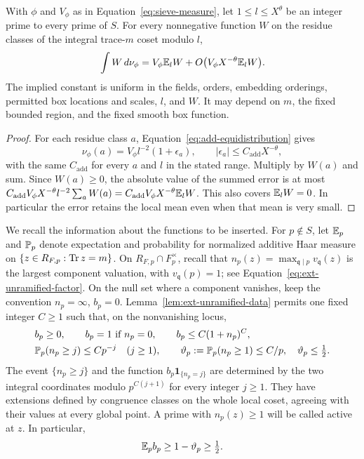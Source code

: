 \begin{lemma}\label{lem:sieve-residue-function}
With $\phi$ and $V_\phi$ as in Equation~\eqref{eq:sieve-measure}, let
$1\le l\le X^\theta$ be an integer prime to every prime of $S$.
For every nonnegative
function $W$ on the residue classes of the integral trace-$m$ coset
modulo $l$,
\begin{equation}\label{eq:sieve-residue-function}
 \int W\,d\nu_\phi
   =V_\phi\E_l W+O\bigl(V_\phi X^{-\theta}\E_l W\bigr).
\end{equation}
The implied constant is uniform in the fields, orders, embedding
orderings, permitted box locations and scales, $l$, and $W$.  It may
depend on $m$, the fixed bounded region, and the fixed smooth box function.
\end{lemma}

\begin{proof}
For each residue class $a$, Equation~\eqref{eq:add-equidistribution} gives
\[
 \nu_\phi(a)=V_\phi l^{-2}(1+\epsilon_a),
 \qquad |\epsilon_a|\le C_{\mathrm{add}}X^{-\theta},
\]
with the same $C_{\mathrm{add}}$ for every $a$ and $l$ in the stated range.
Multiply by
$W(a)$ and sum.  Since $W(a)\ge0$, the absolute value of the summed error
is at most
$C_{\mathrm{add}}V_\phi X^{-\theta}l^{-2}\sum_a W(a)
 =C_{\mathrm{add}}V_\phi X^{-\theta}\E_l W$.
This also covers $\E_l W=0$.  In particular the error retains the local
mean even when that mean is very small.
\end{proof}

We recall the information about the functions to be inserted.  For
$p\notin S$, let $\E_p$ and $\P_p$ denote expectation and probability for
normalized additive Haar measure on
$\{z\in R_{F,p}:\Tr z=m\}$.  On $R_{F,p}\cap F_p^\times$, recall that
$n_p(z)=\max_{\mathfrak q\mid p}v_{\mathfrak q}(z)$ is the largest
component valuation, with $v_{\mathfrak q}(p)=1$; see
Equation~\eqref{eq:ext-unramified-factor}.  On the null set where a
component vanishes, keep the convention $n_p=\infty$, $b_p=0$.
Lemma~\ref{lem:ext-unramified-data} permits one fixed integer $C\ge1$
such that, on the nonvanishing locus,
\begin{align}
 &b_p\ge0,\qquad b_p=1\ \text{if }n_p=0,\qquad
 b_p\le C(1+n_p)^C,\label{eq:sieve-local-weight}\\
 &\P_p(n_p\ge j)\le Cp^{-j}\quad(j\ge1),\qquad
 \vartheta_p:=\P_p(n_p\ge1)\le C/p,\quad
 \vartheta_p\le\tfrac12. \label{eq:sieve-local-tail}
\end{align}
The event $\{n_p\ge j\}$ and the function
$b_p\mathbf 1_{\{n_p=j\}}$ are determined by the two integral coordinates
modulo $p^{C(j+1)}$ for every integer $j\ge1$.  They have extensions
defined by congruence classes on the whole local coset, agreeing with their values at every
global point.  A prime with $n_p(z)\ge1$ will be called active at $z$.
In particular,
\begin{equation}\label{eq:sieve-mean-lower}
 \E_p b_p\ge1-\vartheta_p\ge\tfrac12.
\end{equation}

